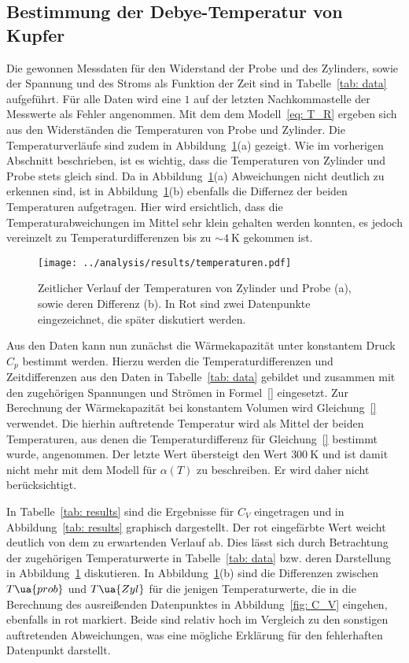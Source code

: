 \subsection{Bestimmung der Debye-Temperatur von Kupfer}
Die gewonnen Messdaten für den Widerstand der Probe und des Zylinders, sowie der Spannung und des Stroms
als Funktion der Zeit sind in Tabelle~\ref{tab: data} aufgeführt. Für alle Daten wird eine $1$ auf der letzten
Nachkommastelle der Messwerte als Fehler angenommen. 
Mit dem dem Modell~\eqref{eq: T_R} ergeben sich aus den Widerständen die Temperaturen von Probe und Zylinder.
Die Temperaturverläufe sind zudem in Abbildung~\ref{fig: temp}(a) gezeigt. Wie im vorherigen Abschnitt beschrieben, ist es 
wichtig, dass die Temperaturen von Zylinder und Probe stets gleich sind. Da in Abbildung~\ref{fig: temp}(a) Abweichungen nicht 
deutlich zu erkennen sind, ist in Abbildung~\ref{fig: temp}(b) ebenfalls die Differnez der beiden Temperaturen 
aufgetragen. Hier wird ersichtlich, dass die Temperaturabweichungen im Mittel sehr klein gehalten werden konnten, es
jedoch vereinzelt zu Temperaturdifferenzen bis zu $\sim\!\SI{4}{\kelvin}$ gekommen ist.




\begin{figure}
\centering
\texttt{[image: ../analysis/results/temperaturen.pdf]}
\caption{Zeitlicher Verlauf der Temperaturen von Zylinder und Probe (a), sowie deren Differenz (b). In Rot sind 
        zwei Datenpunkte eingezeichnet, die später diskutiert werden.}
\label{fig: temp}
\end{figure}

Aus den Daten kann nun zunächst die Wärmekapazität unter konstantem Druck $C_p$ bestimmt werden. Hierzu werden 
die Temperaturdifferenzen und Zeitdifferenzen aus den Daten in Tabelle~\ref{tab: data} gebildet und zusammen mit den 
zugehörigen Spannungen und Strömen in Formel~\eqref{} eingesetzt. 
Zur Berechnung der Wärmekapazität
bei konstantem Volumen wird Gleichung~\eqref{} verwendet. Die hierhin auftretende Temperatur wird als Mittel 
der beiden Temperaturen, aus denen die Temperaturdifferenz für Gleichung~\eqref{} bestimmt wurde, angenommen. 
Der letzte Wert übersteigt den Wert $\SI{300}{\kelvin}$ und ist damit nicht mehr mit dem Modell für $\alpha(T)$
zu beschreiben. Er wird daher nicht berücksichtigt.



In Tabelle~\ref{tab: results} sind die Ergebnisse für $C_V$ eingetragen und in Abbildung~\ref{tab: results} graphisch dargestellt. 
Der rot eingefärbte Wert weicht deutlich von dem zu erwartenden Verlauf ab. Dies lässt sich durch Betrachtung der 
zugehörigen Temperaturwerte in Tabelle~\ref{tab: data} bzw. deren Darstellung in Abbildung~\ref{fig: temp} diskutieren. In Abbildung~\ref{fig: temp}(b)
sind die Differenzen zwischen $T\ua{prob}$ und $T\ua{Zyl}$ für die jenigen Temperaturwerte, die in die Berechnung des 
ausreißenden Datenpunktes in Abbildung~\ref{fig: C_V} eingehen, ebenfalls in rot markiert. Beide sind relativ hoch im Vergleich zu den 
sonstigen auftretenden Abweichungen, was eine mögliche Erklärung für den fehlerhaften Datenpunkt darstellt.  

